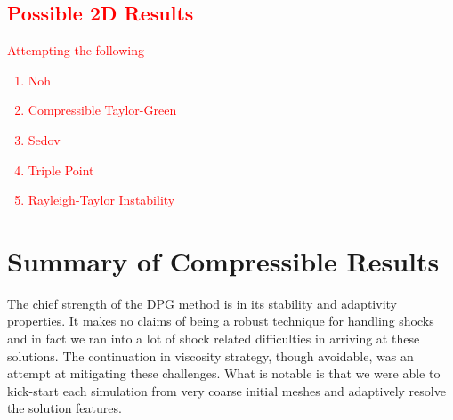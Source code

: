 \documentclass[Dissertation.tex]{subfiles}
\begin{document}
\textcolor{red}{\subsection{Possible 2D Results}
Attempting the following
\begin{enumerate}
\item{Noh}
\item{Compressible Taylor-Green}
\item{Sedov}
\item{Triple Point}
\item{Rayleigh-Taylor Instability}
\end{enumerate}
}

\section{Summary of Compressible Results}
The chief strength of the DPG method is in its stability and adaptivity properties.
It makes no claims of being a robust technique for handling shocks
and in fact we ran into a lot of shock related difficulties in arriving at these solutions.
The continuation in viscosity strategy, though avoidable, was an attempt at mitigating these challenges.
What is notable is that we were able to kick-start each simulation from very coarse initial meshes
and adaptively resolve the solution features.
\end{document}
